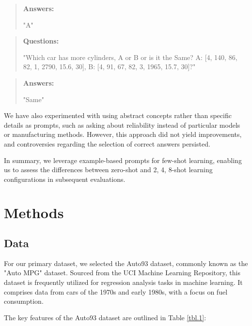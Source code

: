 \documentclass{ieeeaccess}
\newenvironment{Questions}{
    \begin{quote}
    \textbf{Questions:}
}{\end{quote}}
\newenvironment{Answers}{
    \begin{quote}
    \textbf{Answers:}
}{\end{quote}}
\begin{document}
\begin{Answers}
"A"
\end{Answers}
\begin{Questions}
"Which car has more cylinders, A or B or is it the Same? A: [4, 140, 86, 82, 1, 2790, 15.6, 30], B: [4, 91, 67, 82, 3, 1965, 15.7, 30]?"
\end{Questions}

\begin{Answers}
"Same"
\end{Answers}

We have also experimented with using abstract concepts rather than specific details as prompts, such as asking about reliability instead of particular models or manufacturing methods. However, this approach did not yield improvements, and controversies regarding the selection of correct answers persisted.

In summary, we leverage example-based prompts for few-shot learning, enabling us to assess the differences between zero-shot and {2, 4, 8}-shot learning configurations in subsequent evaluations.

    \section{Methods}
    \label{sec:methods}
    \subsection{Data}
    For our primary dataset, we selected the Auto93 dataset, commonly known as the "Auto MPG" dataset. Sourced from the UCI Machine Learning Repository, this dataset is frequently utilized for regression analysis tasks in machine learning. It comprises data from cars of the 1970s and early 1980s, with a focus on fuel consumption\cite{auto_mpg_1993}.

    The key features of the Auto93 dataset are outlined in Table \ref{tbl.1}:
\end{document}
